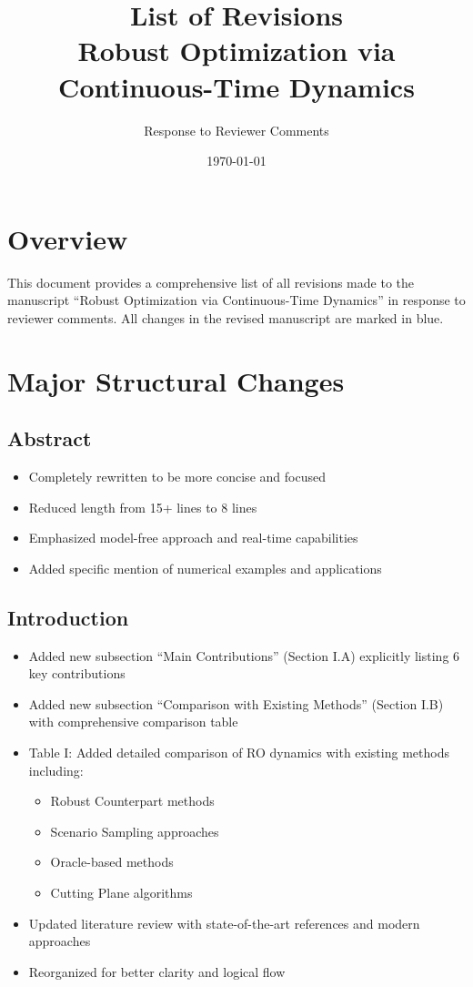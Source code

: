 \documentclass[11pt]{article}
\title{\Large List of Revisions\\
\vspace{0.5em}
\large Robust Optimization via Continuous-Time Dynamics}
\author{Response to Reviewer Comments}
\date{\today}
\begin{document}
\maketitle

\section*{Overview}
This document provides a comprehensive list of all revisions made to the manuscript ``Robust Optimization via Continuous-Time Dynamics'' in response to reviewer comments. All changes in the revised manuscript are marked in {\color{blue}blue}.

\section{Major Structural Changes}

\subsection{Abstract}
\begin{itemize}
\item Completely rewritten to be more concise and focused
\item Reduced length from 15+ lines to 8 lines
\item Emphasized model-free approach and real-time capabilities
\item Added specific mention of numerical examples and applications
\end{itemize}

\subsection{Introduction}
\begin{itemize}
\item Added new subsection ``Main Contributions'' (Section I.A) explicitly listing 6 key contributions
\item Added new subsection ``Comparison with Existing Methods'' (Section I.B) with comprehensive comparison table
\item Table I: Added detailed comparison of RO dynamics with existing methods including:
  \begin{itemize}
  \item Robust Counterpart methods
  \item Scenario Sampling approaches
  \item Oracle-based methods
  \item Cutting Plane algorithms
  \end{itemize}
\item Updated literature review with state-of-the-art references and modern approaches
\item Reorganized for better clarity and logical flow
\end{itemize}
\end{document}

